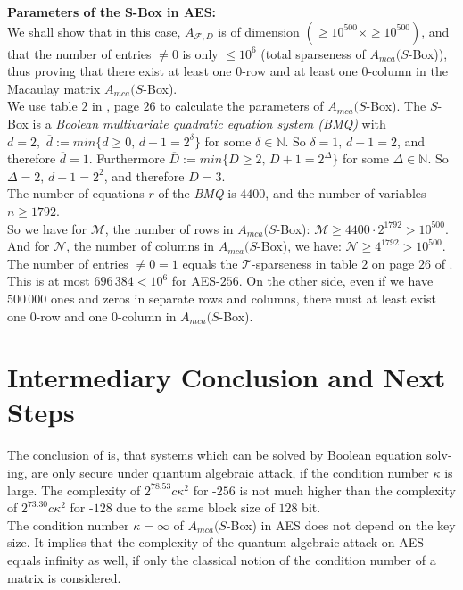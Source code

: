 \documentclass[a4paper,11pt]{article}
\begin{document}
\begin{otherlanguage}{english}
\noindent
\textbf{Parameters of the S-Box in \textsc{AES}:} \\
We shall show that in this case, $A_{\mathcal{F},D}$ is of dimension $( \geq 10^{500} \times \geq 10^{500})$, and that the number of entries $\neq 0$ is only $\leq 10^6$ (total sparseness of $A_{mca}(S$-Box)), thus proving that there exist at least one $0$-row and at least one $0$-column in the Macaulay matrix $A_{mca}(S$-Box).\\

\noindent
We use table $2$ in \cite{QAA}, page $26$ to calculate the parameters of $A_{mca}(S$-Box). The $S$-Box is a \textit{Boolean multivariate quadratic equation system (BMQ)} with $d = 2,\,\, \overline{d} := min \{d \geq 0,\, d + 1 = 2^\delta\}$ for some  $\delta \in \mathbb{N}$. So $\delta = 1, \, d + 1 = 2$, and therefore $\overline{d} = 1$. Furthermore $\overline{D}:= min \{D \geq 2, \, D + 1 = 2^\Delta\}$ for some $\Delta \in \mathbb{N}$. So $\Delta = 2, \, d + 1 = 2^2$, and therefore $\overline{D} = 3$. \\

\noindent
The number of equations $r$ of the \textit{BMQ} is $4400$, and the number of variables $n \geq 1792$. \\
So we have for $\mathcal{M}$, the number of rows in $A_{mca}(S$-Box): $\mathcal{M} \geq 4400 \cdot 2^{1792} > 10^{500}$.\\
And for $\mathcal{N}$, the number of columns in $A_{mca}(S$-Box), we have: $\mathcal{N} \geq 4^{1792} > 10^{500}$. \\

\noindent
The number of entries $\neq 0 = 1$ equals the $\mathcal{T}$-sparseness in table $2$ on page $26$ of \cite{QAA}. This is at most $696\,384 < 10^6$ for \textsc{AES}-$256$. On the other side, even if we have $500\,000$ ones and zeros in separate rows and columns, there must at least exist one $0$-row and one $0$-column in $A_{mca}(S$-Box).\\ 


\section{Intermediary Conclusion and Next Steps}

\noindent
The conclusion of \cite{QAA} is, that systems which can be solved by Boolean equation solving, are only secure under quantum algebraic attack, if the condition number $\kappa$ is large. The complexity of $2^{78.53}c\kappa^2$ for -$256$ is not much higher than the complexity of $2^{73.30}c\kappa^2$ for -$128$ due to the same block size of $128$ bit.\\
The condition number $\kappa = \infty$ of $A_{mca}(S$-Box) in \textsc{AES} does not depend on the key size. It implies that the complexity of the quantum algebraic attack on \textsc{AES} equals infinity as well, if only the classical notion of the condition number of a matrix is considered. \\


\end{otherlanguage}
\end{document}
